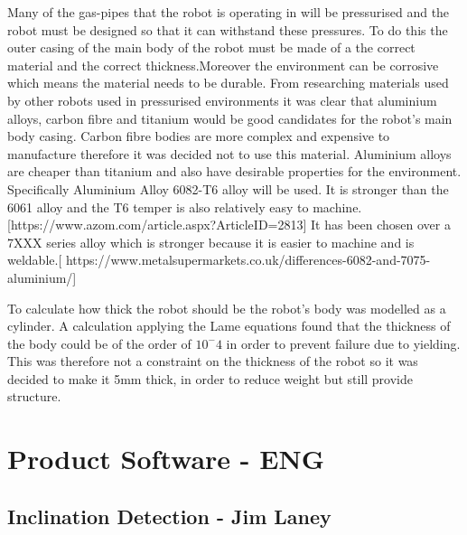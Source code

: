 \documentclass[11pt]{article}		%
\begin{document}
			Many of the gas-pipes that the robot is operating in will be pressurised and the robot must be designed so that it can withstand these pressures. To do this the outer casing of the main body of the robot must be made of a the correct material and the correct thickness.Moreover the environment can be corrosive which means the material needs to be durable.
		    From researching materials used by other robots used in pressurised environments it was clear that aluminium alloys, carbon fibre and titanium would be good candidates for the robot’s main body casing. Carbon fibre bodies are more complex and expensive to manufacture therefore it was decided not to use this material. Aluminium alloys are cheaper than titanium and also have desirable properties for the environment.
		    Specifically Aluminium Alloy 6082-T6 alloy will be used. It is stronger than the 6061 alloy and the T6 temper is also relatively easy to machine. [https://www.azom.com/article.aspx?ArticleID=2813]  It has been chosen over a 7XXX series alloy which is stronger because it is easier to machine and is weldable.[  https://www.metalsupermarkets.co.uk/differences-6082-and-7075-aluminium/] 
		    
		   To calculate how thick the robot should be the robot's body was modelled as a cylinder. A calculation applying the Lame equations found that the thickness of the body could be of the order of $10^-4$ in order to prevent failure due to yielding. This was therefore not a constraint on the thickness of the robot so it was decided to make it 5mm thick, in order to reduce weight but still provide structure.
	
	\section{Product Software - ENG}
		
		\subsection[Inclination Detection]{Inclination Detection - Jim Laney} \label{poseCalculation}
		
\end{document}
